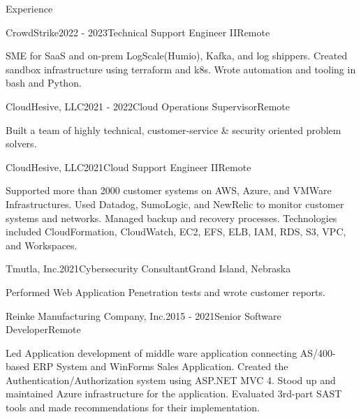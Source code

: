 \documentclass{resume} %
\begin{document}

\begin{rSection}{Experience}

\begin{rSubsection}{CrowdStrike}{2022 - 2023}{Technical Support Engineer II}{Remote}
	\item SME for SaaS and on-prem LogScale(Humio), Kafka, and log shippers. Created sandbox infrastructure using terraform and k8s. Wrote automation and tooling in bash and Python.
\end{rSubsection}

\begin{rSubsection}{CloudHesive, LLC}{2021 - 2022}{Cloud Operations Supervisor}{Remote}
\item Built a team of highly technical, customer-service \& security oriented problem solvers.  
\end{rSubsection}

\begin{rSubsection}{CloudHesive, LLC}{2021}{Cloud Support Engineer II}{Remote}
\item Supported more than 2000 customer systems on AWS, Azure, and VMWare Infrastructures. Used Datadog, SumoLogic, and NewRelic to monitor customer systems and networks. Managed backup and recovery processes. Technologies included CloudFormation, CloudWatch, EC2, EFS, ELB, IAM, RDS, S3, VPC, and Workspaces.  
\end{rSubsection}

\begin{rSubsection}{Tmutla, Inc.}{2021}{Cybersecurity Consultant}{Grand Island, Nebraska}
\item Performed Web Application Penetration tests and wrote customer reports.
\end{rSubsection}

\begin{rSubsection}{Reinke Manufacturing Company, Inc.}{2015 - 2021}{Senior Software Developer}{Remote} 
\item Led Application development of middle ware application connecting AS/400-based ERP System and WinForms Sales Application. Created the Authentication/Authorization system using ASP.NET MVC 4. Stood up and maintained Azure infrastructure for the application. Evaluated 3rd-part SAST tools and made recommendations for their implementation.
\end{rSubsection}


\end{rSection}
\end{document}
